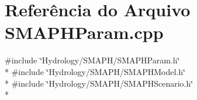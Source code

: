 \section{Referência do Arquivo S\+M\+A\+P\+H\+Param.\+cpp}
\label{_s_m_a_p_h_param_8cpp}
{\ttfamily \#include \char`\"{}Hydrology/\+S\+M\+A\+P\+H/\+S\+M\+A\+P\+H\+Param.\+h\char`\"{}}\\*
{\ttfamily \#include \char`\"{}Hydrology/\+S\+M\+A\+P\+H/\+S\+M\+A\+P\+H\+Model.\+h\char`\"{}}\\*
{\ttfamily \#include \char`\"{}Hydrology/\+S\+M\+A\+P\+H/\+S\+M\+A\+P\+H\+Scenario.\+h\char`\"{}}\\*
